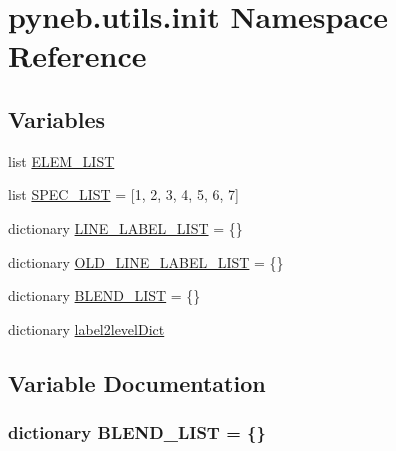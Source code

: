 \hypertarget{namespacepyneb_1_1utils_1_1init}{}\section{pyneb.\+utils.\+init Namespace Reference}
\label{namespacepyneb_1_1utils_1_1init}
\subsection*{Variables}
\begin{DoxyCompactItemize}
\item 
list \hyperlink{namespacepyneb_1_1utils_1_1init_af5a11a312a4ec31ace89027a644a39f2}{E\+L\+E\+M\+\_\+\+L\+I\+S\+T}
\item 
list \hyperlink{namespacepyneb_1_1utils_1_1init_a47360d2d66e5f0a81989d968227cd259}{S\+P\+E\+C\+\_\+\+L\+I\+S\+T} = \mbox{[}\textquotesingle{}1\textquotesingle{}, \textquotesingle{}2\textquotesingle{}, \textquotesingle{}3\textquotesingle{}, \textquotesingle{}4\textquotesingle{}, \textquotesingle{}5\textquotesingle{}, \textquotesingle{}6\textquotesingle{}, \textquotesingle{}7\textquotesingle{}\mbox{]}
\item 
dictionary \hyperlink{namespacepyneb_1_1utils_1_1init_a2819312869609a6e39b7c8ebd4d1e718}{L\+I\+N\+E\+\_\+\+L\+A\+B\+E\+L\+\_\+\+L\+I\+S\+T} = \{\}
\item 
dictionary \hyperlink{namespacepyneb_1_1utils_1_1init_a73f9a0a6cbae574488d50a7af6fbfa1d}{O\+L\+D\+\_\+\+L\+I\+N\+E\+\_\+\+L\+A\+B\+E\+L\+\_\+\+L\+I\+S\+T} = \{\}
\item 
dictionary \hyperlink{namespacepyneb_1_1utils_1_1init_ad9b77c5e4538ba2dda2b28727b3b01d7}{B\+L\+E\+N\+D\+\_\+\+L\+I\+S\+T} = \{\}
\item 
dictionary \hyperlink{namespacepyneb_1_1utils_1_1init_a4095c9ea31cb082d2a7edae4b74bd55b}{label2level\+Dict}
\end{DoxyCompactItemize}


\subsection{Variable Documentation}
\hypertarget{namespacepyneb_1_1utils_1_1init_ad9b77c5e4538ba2dda2b28727b3b01d7}{}
\subsubsection[{B\+L\+E\+N\+D\+\_\+\+L\+I\+S\+T}]{\setlength{\rightskip}{0pt plus 5cm}dictionary B\+L\+E\+N\+D\+\_\+\+L\+I\+S\+T = \{\}}\label{namespacepyneb_1_1utils_1_1init_ad9b77c5e4538ba2dda2b28727b3b01d7}
\hypertarget{namespacepyneb_1_1utils_1_1init_af5a11a312a4ec31ace89027a644a39f2}{}
